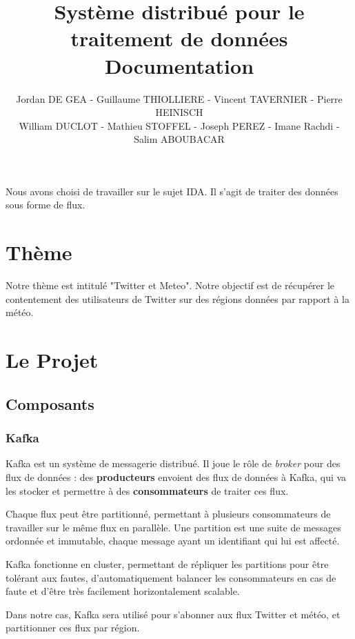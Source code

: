 \documentclass[a4paper,oneside,10pt]{article}
\title{Système distribué pour le traitement de données\\
Documentation
}
\author{Jordan DE GEA - Guillaume THIOLLIERE - Vincent TAVERNIER - Pierre HEINISCH\\
William DUCLOT - Mathieu STOFFEL - Joseph PEREZ - Imane Rachdi - Salim ABOUBACAR}
\begin{document}
\maketitle

Nous avons choisi de travailler sur le sujet IDA. Il s'agit de traiter des données sous forme de flux. \\

\section{Thème} 

Notre thème est intitulé "Twitter et Meteo". Notre objectif est de récupérer le contentement des utilisateurs de Twitter sur des régions données par rapport à la météo. 

\section{Le Projet}

\subsection{Composants}

\subsubsection{Kafka}

Kafka est un système de messagerie distribué. Il joue le r\^ole de \textit{broker} pour des flux de données : des \textbf{producteurs} envoient des flux de données à Kafka, qui va les stocker et permettre à des \textbf{consommateurs} de traiter ces flux.

Chaque flux peut \^etre partitionné, permettant à plusieurs consommateurs de travailler sur le m\^eme flux en parallèle. Une partition est une suite de messages ordonnée et immutable, chaque message ayant un identifiant qui lui est affecté.

Kafka fonctionne en cluster, permettant de répliquer les partitions pour être tolérant aux fautes, d'automatiquement balancer les consommateurs en cas de faute et d'être très facilement horizontalement scalable.

Dans notre cas, Kafka sera utilisé pour s'abonner aux flux Twitter et météo, et partitionner ces flux par région.
\end{document}
